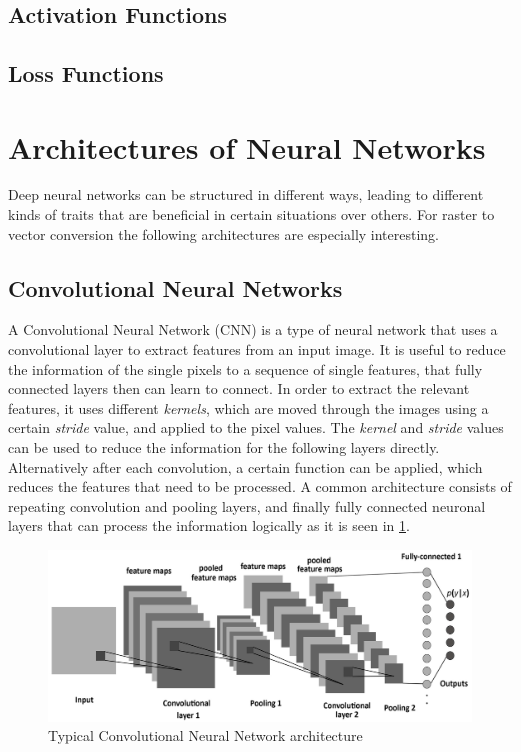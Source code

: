 \documentclass[12pt, a4paper, titlepage]{report}
\begin{document}
\pagebreak

\section{}
\subsection{Activation Functions}
\subsection{Loss Functions}

\section{Architectures of Neural Networks}

Deep neural networks can be structured in different ways, leading to different kinds of traits that are beneficial in certain situations over others. For raster to vector conversion the following architectures are especially interesting.

\subsection{Convolutional Neural Networks}

A Convolutional Neural Network (CNN) is a type of neural network that uses a convolutional layer to extract features from an input image. It is useful to reduce the information of the single pixels to a sequence of single features, that fully connected layers then can learn to connect. In order to extract the relevant features, it uses different \emph{kernels}, which are moved through the images using a certain \emph{stride} value, and applied to the pixel values. The \emph{kernel} and \emph{stride} values can be used to reduce the information for the following layers directly. Alternatively after each convolution, a certain function can be applied, which reduces the features that need to be processed. A common architecture consists of repeating convolution and pooling layers, and finally fully connected neuronal layers that can process the information logically as it is seen in \ref{fig:cnn_architecture}.

\begin{figure}
	\centering
	\includegraphics[width=1.0\textwidth]{../rc/images/cnn_architecture.png}
   \caption{Typical Convolutional Neural Network architecture \cite{img_cnn_architecture}}
	\label{fig:cnn_architecture}
\end{figure}
\end{document}
